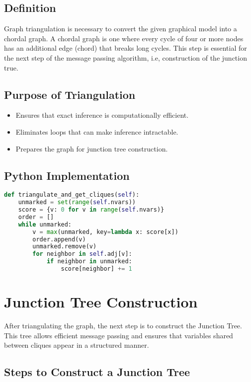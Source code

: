 \subsection{Definition}
Graph triangulation is necessary to convert the given graphical model into a chordal graph. A chordal graph is one where every cycle of four or more nodes has an additional edge (chord) that breaks long cycles. This step is essential for the next step of the message passing algorithm, i.e, construction of the junction true.

\subsection{Purpose of Triangulation}

\begin{itemize}
    \item Ensures that exact inference is computationally efficient.
    \item Eliminates loops that can make inference intractable.
    \item Prepares the graph for junction tree construction.
\end{itemize}

\subsection{Python Implementation}

\begin{lstlisting}[language=Python]
def triangulate_and_get_cliques(self):
    unmarked = set(range(self.nvars))
    score = {v: 0 for v in range(self.nvars)}
    order = []
    while unmarked:
        v = max(unmarked, key=lambda x: score[x])
        order.append(v)
        unmarked.remove(v)
        for neighbor in self.adj[v]:
            if neighbor in unmarked:
                score[neighbor] += 1
\end{lstlisting}

\section{Junction Tree Construction}

After triangulating the graph, the next step is to construct the Junction Tree. This tree allows efficient message passing and ensures that variables shared between cliques appear in a structured manner.

\subsection{Steps to Construct a Junction Tree}

